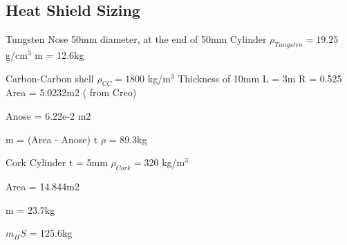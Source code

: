 		
		
		\subsection{Heat Shield Sizing}
		Tungsten Nose
		50mm diameter, at the end of 50mm Cylinder
		$\rho_{Tungsten} = 19.25$  g/cm$^3$
		m = 12.6kg
		
		Carbon-Carbon shell
		$\rho_{CC} = 1800$  kg/m$^3$
		Thickness of 10mm
		L = 3m
		R = 0.525
		Area = 5.0232m2 ( from Creo)
		
		Anose = 6.22e-2 m2
		
		m = (Area - Anose) t $\rho$ = 89.3kg
		
		
		Cork Cylinder
		t = 5mm
		$\rho_{Cork} = 320$  kg/m$^3$
		
		Area = 14.844m2
		
		m = 23.7kg
		
		
		$m_HS$ = 125.6kg
		